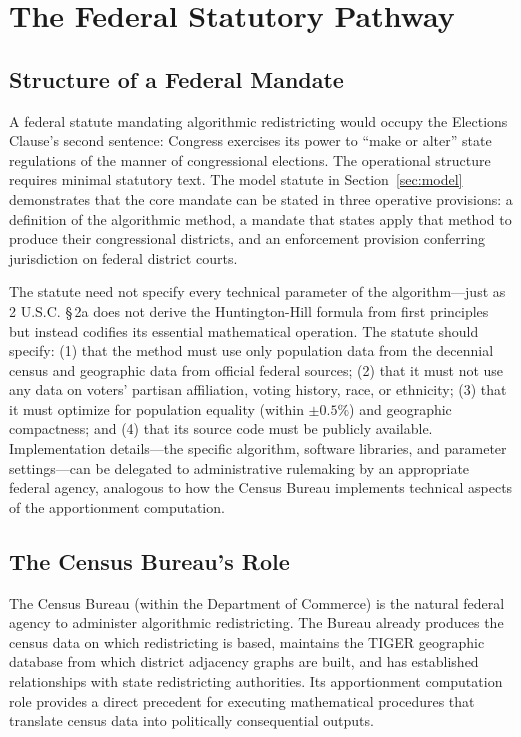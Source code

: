 \section{The Federal Statutory Pathway}
\label{sec:federal}

\subsection{Structure of a Federal Mandate}

A federal statute mandating algorithmic redistricting would occupy the Elections Clause's second sentence: Congress exercises its power to ``make or alter'' state regulations of the manner of congressional elections. The operational structure requires minimal statutory text. The model statute in Section~\ref{sec:model} demonstrates that the core mandate can be stated in three operative provisions: a definition of the algorithmic method, a mandate that states apply that method to produce their congressional districts, and an enforcement provision conferring jurisdiction on federal district courts.

The statute need not specify every technical parameter of the algorithm---just as 2 U.S.C. \S\,2a does not derive the Huntington-Hill formula from first principles but instead codifies its essential mathematical operation. The statute should specify: (1) that the method must use only population data from the decennial census and geographic data from official federal sources; (2) that it must not use any data on voters' partisan affiliation, voting history, race, or ethnicity; (3) that it must optimize for population equality (within $\pm 0.5\%$) and geographic compactness; and (4) that its source code must be publicly available. Implementation details---the specific algorithm, software libraries, and parameter settings---can be delegated to administrative rulemaking by an appropriate federal agency, analogous to how the Census Bureau implements technical aspects of the apportionment computation.

\subsection{The Census Bureau's Role}

The Census Bureau (within the Department of Commerce) is the natural federal agency to administer algorithmic redistricting. The Bureau already produces the census data on which redistricting is based, maintains the TIGER geographic database from which district adjacency graphs are built, and has established relationships with state redistricting authorities. Its apportionment computation role provides a direct precedent for executing mathematical procedures that translate census data into politically consequential outputs.

